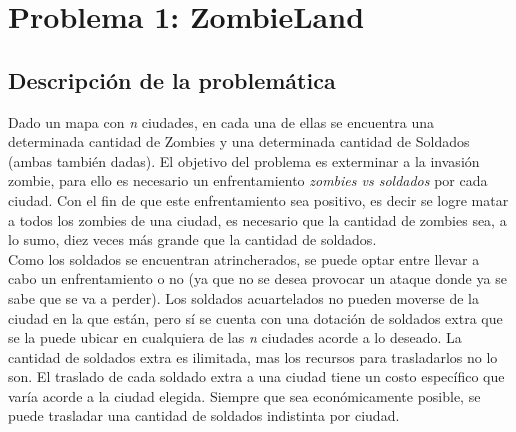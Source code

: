 \documentclass[a4paper]{article}
\begin{document}
\thispagestyle{empty}


\maketitle
\newpage

\thispagestyle{empty}
\vfill
\begin{abstract}
Habi\'endonos sido dado una serie de tres problem\'aticas a resolver, se plantean sus respectivas soluciones acorde a los requisitos pedidos. Se adjunta una descripci\'on de cada problema y su soluci\'on, conjunto a su an\'alisis de correctitud y de complejidad sumado a su experimentaci\'on. El lenguaje elegido para llevar a cabo el trabajo es C++.
\end{abstract}

\thispagestyle{empty}
\vspace{3cm}
\tableofcontents
\newpage


\newpage

\section{Problema 1: ZombieLand}

\subsection{Descripci\'on de la problem\'atica}

Dado un mapa con \emph{n} ciudades, en cada una de ellas se encuentra una determinada cantidad de Zombies y una determinada cantidad de Soldados (ambas tambi\'en dadas). El objetivo del problema es exterminar a la invasi\'on zombie, para ello es necesario un enfrentamiento \textit{zombies vs soldados} por cada ciudad. Con el fin de que este enfrentamiento sea positivo, es decir se logre matar a todos los zombies de una ciudad, es necesario que la cantidad de zombies sea, a lo sumo, diez veces m\'as grande que la cantidad de soldados.\\

Como los soldados se encuentran atrincherados, se puede optar entre llevar a cabo un enfrentamiento o no (ya que no se desea provocar un ataque donde ya se sabe que se va a perder). Los soldados acuartelados no pueden moverse de la ciudad en la que est\'an, pero s\'i se cuenta con una dotaci\'on de soldados extra que se la puede ubicar en cualquiera de las \emph{n} ciudades acorde a lo deseado. La cantidad de soldados extra es ilimitada, mas los recursos para trasladarlos no lo son. El traslado de cada soldado extra a una ciudad tiene un costo espec\'ifico que var\'ia acorde a la ciudad elegida. Siempre que sea econ\'omicamente posible, se puede trasladar una cantidad de soldados indistinta por ciudad.\\
\end{document}
